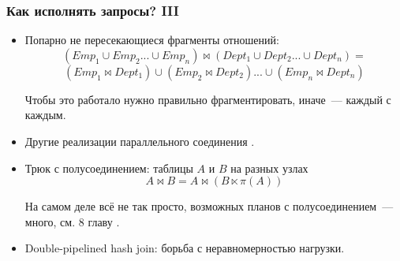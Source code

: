 \documentclass{beamer}
\begin{document}
\begin{frame}
\frametitle{Как исполнять запросы? III}

\begin{itemize}
  \setlength\itemsep{1em}

  \item Попарно не пересекающиеся фрагменты отношений: 
  $$(Emp_1 \cup Emp_2 ... \cup Emp_n) \bowtie (Dept_1 \cup Dept_2 ... \cup Dept_n) =$$ $$(Emp_1 \bowtie Dept_1) \cup (Emp_2 \bowtie Dept_2) ... \cup (Emp_n \bowtie Dept_n)$$
  
  Чтобы это работало нужно правильно фрагментировать, иначе~--- каждый с каждым.
  
  \item Другие реализации параллельного соединения \cite{Taniar2008}.

  \item Трюк с полусоединением: таблицы $A$ и $B$ на разных узлах \\
  $$A \bowtie B = A \bowtie (B \ltimes \pi (A))$$

  На самом деле всё не так просто, возможных планов с полусоединением~--- много, см. 8 главу \cite{Ozsu2011}.

  \item Double-pipelined hash join: борьба с неравномерностью нагрузки.

\end{itemize}

\end{frame}
\end{document}
